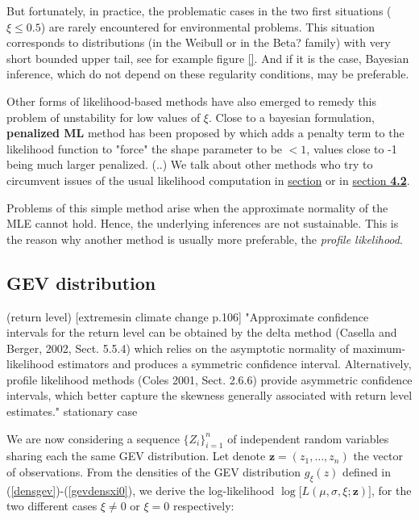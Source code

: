 \documentclass[11pt,a4paper,openany ]{book}
\begin{document}
But fortunately, in practice, the problematic cases in the two first situations ($\xi\leq 0.5$) are rarely encountered for environmental problems. This situation corresponds to distributions (in the Weibull or in the Beta? family) with very short bounded upper tail, see for example figure \ref{}.
And if it is the case, Bayesian inference, which do not depend on these regularity conditions, may be preferable.

Other forms of likelihood-based methods have also emerged to remedy this problem of unstability for low values of $\xi$. Close to a bayesian formulation, \textbf{ penalized ML} method has been proposed by \citet{coles_likelihood-based_1999} which adds a penalty term to the likelihood function to "force" the shape parameter to be $<1$, %
values close to -1 being much larger penalized. (..) We talk about other methods who try to circumvent issues of the usual likelihood computation in \hyperref[pwmm]{section} or in \hyperref[improvinf]{section\textbf{ 4.2}}.

Problems of this simple method arise when the approximate normality of the MLE cannot hold. Hence, the underlying inferences are not sustainable. This is the reason why another method is usually more preferable, the \emph{profile likelihood}.



\subsection*{GEV distribution}

(return level) [extremesin climate change p.106] "Approximate confidence intervals for the return level can be obtained by the
delta method (Casella and Berger, 2002, Sect. 5.5.4) which relies on the asymptotic
normality of maximum-likelihood estimators and produces a symmetric confidence
interval. Alternatively, profile likelihood methods (Coles 2001, Sect. 2.6.6) provide
asymmetric confidence intervals, which better capture the skewness generally
associated with return level estimates." stationary case

We are now considering a sequence $\{Z_i\}_{i=1}^n$ of independent random variables sharing 
each the same GEV distribution. Let denote $\boldsymbol{z}=(z_1,\dots,z_n)$ the vector of 
observations.
From the densities of the GEV distribution $g_{\xi}(z)$ defined in 
(\ref{densgev})-(\ref{gevdensxi0}), we derive the log-likelihood 
$\log\big[L(\mu,\sigma,\xi;\boldsymbol{z})\big]$, for the two different cases $\xi\neq 0$ 
or $\xi=0$ respectively:
\end{document}
